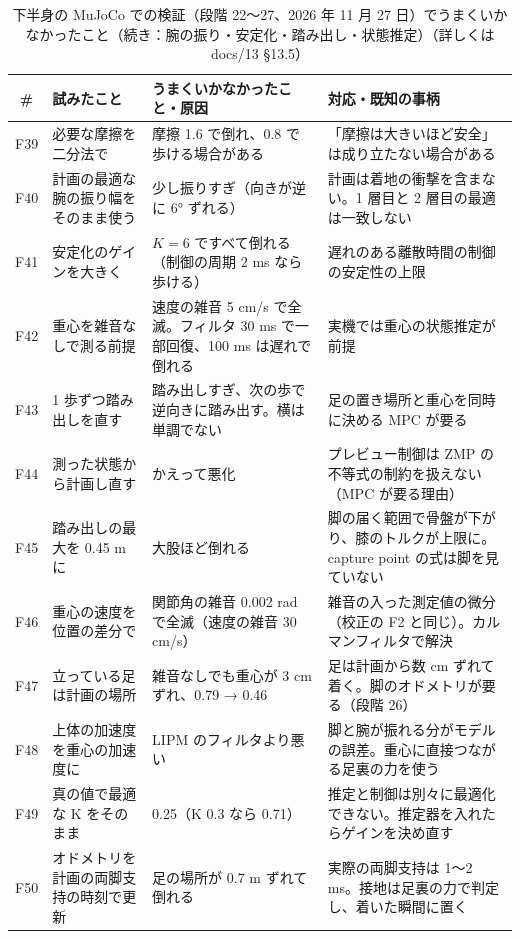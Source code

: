 \documentclass[paper=a4paper,fontsize=10pt,twocolumn,column_gap=2zw,line_length=24zw,number_of_lines=46,head_space=20mm]{jlreq}
\begin{document}
\begin{table}[t]\centering\footnotesize
\caption{下半身の MuJoCo での検証（段階 22〜27、2026 年 11 月 27 日）でうまくいかなかったこと（続き：腕の振り・安定化・踏み出し・状態推定）（詳しくは docs/13 §13.5）}\label{tab:fail4}
\setlength{\tabcolsep}{3pt}
\begin{tabular}{cp{}p{}p{}}\toprule
\# & 試みたこと & うまくいかなかったこと・原因 & 対応・既知の事柄 \\\midrule
F39 & 必要な摩擦を二分法で & 摩擦 1.6 で倒れ、0.8 で歩ける場合がある & 「摩擦は大きいほど安全」は成り立たない場合がある \\
F40 & 計画の最適な腕の振り幅をそのまま使う & 少し振りすぎ（向きが逆に 6° ずれる） & 計画は着地の衝撃を含まない。1 層目と 2 層目の最適は一致しない \\
F41 & 安定化のゲインを大きく & $K=6$ ですべて倒れる（制御の周期 2 ms なら歩ける） & 遅れのある離散時間の制御の安定性の上限 \\
F42 & 重心を雑音なしで測る前提 & 速度の雑音 5 cm/s で全滅。フィルタ 30 ms で一部回復、100 ms は遅れで倒れる & 実機では重心の状態推定が前提 \\
F43 & 1 歩ずつ踏み出しを直す & 踏み出しすぎ、次の歩で逆向きに踏み出す。横は単調でない & 足の置き場所と重心を同時に決める MPC が要る \\
F44 & 測った状態から計画し直す & かえって悪化 & プレビュー制御は ZMP の不等式の制約を扱えない（MPC が要る理由） \\
F45 & 踏み出しの最大を 0.45 m に & 大股ほど倒れる & 脚の届く範囲で骨盤が下がり、膝のトルクが上限に。capture point の式は脚を見ていない \\
F46 & 重心の速度を位置の差分で & 関節角の雑音 0.002 rad で全滅（速度の雑音 30 cm/s） & 雑音の入った測定値の微分（校正の F2 と同じ）。カルマンフィルタで解決 \\
F47 & 立っている足は計画の場所 & 雑音なしでも重心が 3 cm ずれ、0.79 → 0.46 & 足は計画から数 cm ずれて着く。脚のオドメトリが要る（段階 26） \\
F48 & 上体の加速度を重心の加速度に & LIPM のフィルタより悪い & 脚と腕が振れる分がモデルの誤差。重心に直接つながる足裏の力を使う \\
F49 & 真の値で最適な K をそのまま & 0.25（K 0.3 なら 0.71） & 推定と制御は別々に最適化できない。推定器を入れたらゲインを決め直す \\
F50 & オドメトリを計画の両脚支持の時刻で更新 & 足の場所が 0.7 m ずれて倒れる & 実際の両脚支持は 1〜2 ms。接地は足裏の力で判定し、着いた瞬間に置く \\

\end{tabular}
\end{table}
\end{document}

